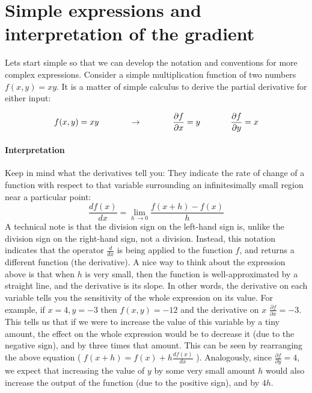 \section*{Simple expressions and interpretation of the gradient}

Lets start simple so that we can develop the notation and conventions for more complex expressions. Consider a simple multiplication function of two numbers $f(x,y)=xy$. It is a matter of simple calculus to derive the partial derivative for either input:

\begin{equation}
f(x,y) = x y \hspace{0.5in} \rightarrow \hspace{0.5in} \frac{\partial f}{\partial x} = y \hspace{0.5in} \frac{\partial f}{\partial y} = x
\end{equation}

\paragraph*{Interpretation} Keep in mind what the derivatives tell you: They indicate the rate of change of a function with respect to that variable surrounding an infinitesimally small region near a particular point:
\begin{equation}
\frac{df(x)}{dx} = \lim_{h\ \to 0} \frac{f(x + h) - f(x)}{h}
\end{equation}
A technical note is that the division sign on the left-hand sign is, unlike the division sign on the right-hand sign, not a division. Instead, this notation indicates that the operator $\frac{d}{dx}$ is being applied to the function $f$, and returns a different function (the derivative). A nice way to think about the expression above is that when $h$ is very small, then the function is well-approximated by a straight line, and the derivative is its slope. In other words, the derivative on each variable tells you the sensitivity of the whole expression on its value. For example, if $x=4,y=-3$ then $f(x,y)=-12$ and the derivative on $x$ $\frac{\partial f}{\partial x} = -3$. This tells us that if we were to increase the value of this variable by a tiny amount, the effect on the whole expression would be to decrease it (due to the negative sign), and by three times that amount. This can be seen by rearranging the above equation ( $f(x + h) = f(x) + h \frac{df(x)}{dx}$ ). Analogously, since $\frac{\partial f}{\partial y} = 4$, we expect that increasing the value of $y$ by some very small amount $h$ would also increase the output of the function (due to the positive sign), and by $4h$.

